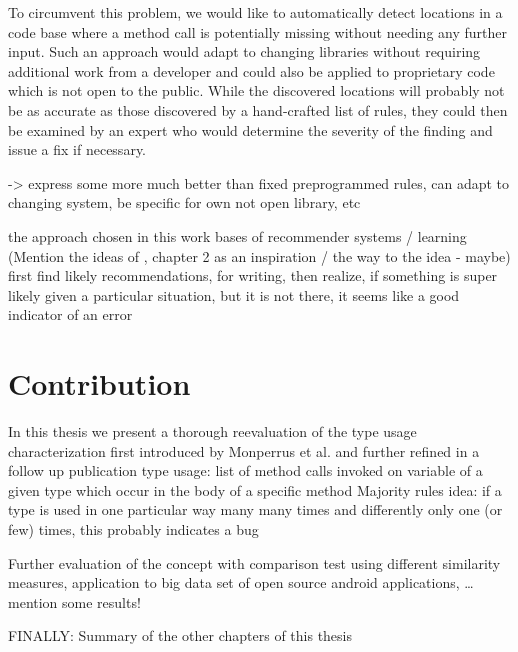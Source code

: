 To circumvent this problem, we would like to automatically detect locations in a code base where a method call is potentially missing without needing any further input.
Such an approach would adapt to changing libraries without requiring additional work from a developer and could also be applied to proprietary code which is not open to the public.
While the discovered locations will probably not be as accurate as those discovered by a hand-crafted list of rules, they could then be examined by an expert who would determine the severity of the finding and issue a fix if necessary.

-> express some more much better than fixed preprogrammed rules, can adapt to changing system, be specific for own not open library, etc

the approach chosen in this work bases of recommender systems / learning
(Mention the ideas of \cite{bruch2012ide}, chapter 2 as an inspiration / the way to the idea - maybe)
first find likely recommendations, for writing, then realize, if something is super likely given a particular situation, but it is not there, it seems like a good indicator of an error

\section{Contribution}

In this thesis we present a thorough reevaluation of the type usage characterization first introduced by Monperrus et al.\cite{monperrus2010detecting} and further refined in a follow up publication \cite{monperrus2013detecting}
type usage: list of method calls invoked on variable of a given type which occur in the body of a specific method
Majority rules idea: if a type is used in one particular way many many times and differently only one (or few) times, this probably indicates a bug

Further evaluation of the concept with comparison test using different similarity measures, application to big data set of open source android applications, \ldots
mention some results!

FINALLY: Summary of the other chapters of this thesis
